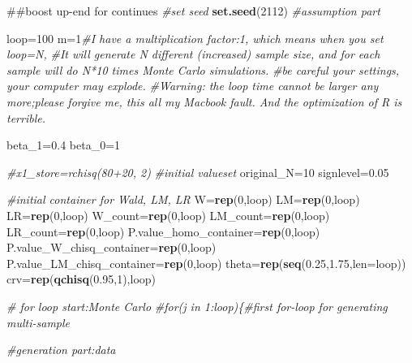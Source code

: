 \documentclass[]{article}
\newenvironment{Shaded}{\begin{snugshade}}{\end{snugshade}}
\newcommand{\KeywordTok}[1]{\textcolor[rgb]{0.13,0.29,0.53}{\textbf{{#1}}}}
\newcommand{\DataTypeTok}[1]{\textcolor[rgb]{0.13,0.29,0.53}{{#1}}}
\newcommand{\DecValTok}[1]{\textcolor[rgb]{0.00,0.00,0.81}{{#1}}}
\newcommand{\FloatTok}[1]{\textcolor[rgb]{0.00,0.00,0.81}{{#1}}}
\newcommand{\CommentTok}[1]{\textcolor[rgb]{0.56,0.35,0.01}{\textit{{#1}}}}
\newcommand{\NormalTok}[1]{{#1}}
\begin{document}
\begin{Shaded}
\begin{Highlighting}[]
\NormalTok{##boost up-end for continues}
\CommentTok{#set seed}
\KeywordTok{set.seed}\NormalTok{(}\DecValTok{2112}\NormalTok{)}
\CommentTok{#assumption part}

\NormalTok{loop=}\DecValTok{100}
\NormalTok{m=}\DecValTok{1}\CommentTok{#I have a multiplication factor:1, which means when you set loop=N, }
\CommentTok{#It will generate N different (increased) sample size, and for each sample will do N*10 times Monte Carlo simulations.}
\CommentTok{#be careful your settings, your computer may explode.}
\CommentTok{#Warning: the loop time cannot be larger any more;please forgive me, this all my Macbook fault. And the optimization of R is terrible.}

\NormalTok{beta_1=}\FloatTok{0.4}
\NormalTok{beta_0=}\DecValTok{1}

\CommentTok{#x1_store=rchisq(80+20, 2)}
\CommentTok{#initial valueset}
\NormalTok{original_N=}\DecValTok{10}
\NormalTok{signlevel=}\FloatTok{0.05}

\CommentTok{#initial container for Wald, LM, LR}
\NormalTok{W=}\KeywordTok{rep}\NormalTok{(}\DecValTok{0}\NormalTok{,loop)}
\NormalTok{LM=}\KeywordTok{rep}\NormalTok{(}\DecValTok{0}\NormalTok{,loop)}
\NormalTok{LR=}\KeywordTok{rep}\NormalTok{(}\DecValTok{0}\NormalTok{,loop)}
\NormalTok{W_count=}\KeywordTok{rep}\NormalTok{(}\DecValTok{0}\NormalTok{,loop)}
\NormalTok{LM_count=}\KeywordTok{rep}\NormalTok{(}\DecValTok{0}\NormalTok{,loop)}
\NormalTok{LR_count=}\KeywordTok{rep}\NormalTok{(}\DecValTok{0}\NormalTok{,loop)}
\NormalTok{P.value_homo_container=}\KeywordTok{rep}\NormalTok{(}\DecValTok{0}\NormalTok{,loop)}
\NormalTok{P.value_W_chisq_container=}\KeywordTok{rep}\NormalTok{(}\DecValTok{0}\NormalTok{,loop)}
\NormalTok{P.value_LM_chisq_container=}\KeywordTok{rep}\NormalTok{(}\DecValTok{0}\NormalTok{,loop)}
\NormalTok{theta=}\KeywordTok{rep}\NormalTok{(}\KeywordTok{seq}\NormalTok{(}\FloatTok{0.25}\NormalTok{,}\FloatTok{1.75}\NormalTok{,}\DataTypeTok{len=}\NormalTok{loop))}
\NormalTok{crv=}\KeywordTok{rep}\NormalTok{(}\KeywordTok{qchisq}\NormalTok{(}\FloatTok{0.95}\NormalTok{,}\DecValTok{1}\NormalTok{),loop)}





\CommentTok{# for loop start:Monte Carlo}
\CommentTok{#for(j in 1:loop)\{#first for-loop for generating multi-sample}



\CommentTok{#generation part:data}



\end{Highlighting}
\end{Shaded}
\end{document}
